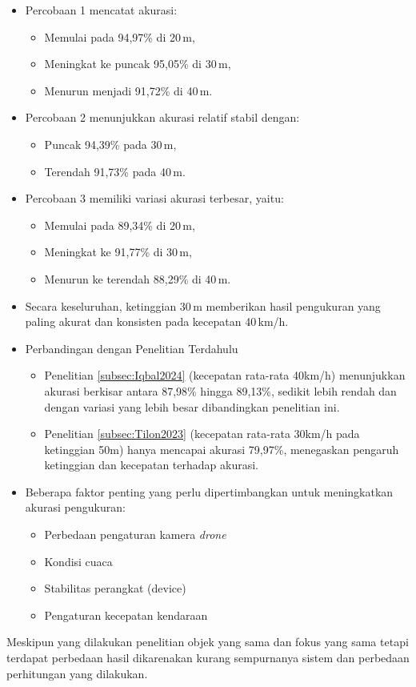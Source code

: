 \begin{itemize}[nolistsep]
  \item Percobaan 1 mencatat akurasi:
    \begin{itemize}[nolistsep]
      \item Memulai pada 94,97\% di 20\,m,
      \item Meningkat ke puncak 95,05\% di 30\,m,
      \item Menurun menjadi 91,72\% di 40\,m.
    \end{itemize}
  \item Percobaan 2 menunjukkan akurasi relatif stabil dengan:
    \begin{itemize}[nolistsep]
      \item Puncak 94,39\% pada 30\,m,
      \item Terendah 91,73\% pada 40\,m.
    \end{itemize}
  \item Percobaan 3 memiliki variasi akurasi terbesar, yaitu:
    \begin{itemize}[nolistsep]
      \item Memulai pada 89,34\% di 20\,m,
      \item Meningkat ke 91,77\% di 30\,m,
      \item Menurun ke terendah 88,29\% di 40\,m.
    \end{itemize}

  \item Secara keseluruhan, ketinggian 30\,m memberikan hasil pengukuran yang paling akurat dan konsisten pada kecepatan 40\,km/h.

  \item Perbandingan dengan Penelitian Terdahulu
	\begin{itemize}[nolistsep]
	\item Penelitian \ref{subsec:Iqbal2024} (kecepatan rata-rata 40km/h) menunjukkan akurasi berkisar antara 87,98\% hingga 89,13\%, sedikit lebih rendah dan dengan variasi yang lebih besar dibandingkan penelitian ini.
	\item Penelitian \ref{subsec:Tilon2023} (kecepatan rata-rata 30km/h pada ketinggian 50m) hanya mencapai akurasi 79,97\%, menegaskan pengaruh ketinggian dan kecepatan terhadap akurasi.
	\end{itemize}
	\item Beberapa faktor penting yang perlu dipertimbangkan untuk meningkatkan akurasi pengukuran:
	\begin{itemize}[nolistsep]
	\item Perbedaan pengaturan kamera \emph{drone}
	\item Kondisi cuaca
	\item Stabilitas perangkat (device)
	\item Pengaturan kecepatan kendaraan
	\end{itemize}
\end{itemize}
Meskipun yang dilakukan penelitian objek yang sama dan fokus yang sama tetapi terdapat perbedaan hasil dikarenakan kurang sempurnanya sistem dan perbedaan perhitungan yang dilakukan.

